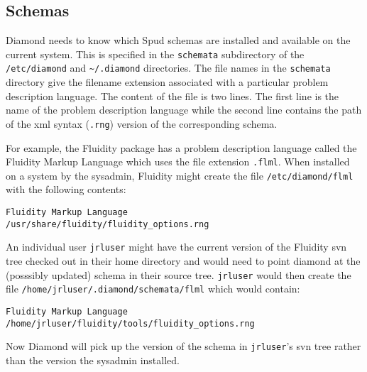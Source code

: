 \documentclass[a4paper, 11pt]{book}
\begin{document}
\subsection{Schemas}

Diamond needs to know which Spud schemas are installed and available on the
current system. This is specified in the \verb+schemata+ subdirectory of the
\verb+/etc/diamond+ and \verb+~/.diamond+ directories. The file names in the
\verb+schemata+ directory give the filename extension associated with a
particular problem description language. The content of the file is two
lines. The first line is the name of the problem description language while
the second line contains the path of the xml syntax (\verb+.rng+) version of
the corresponding schema. 

For example, the Fluidity package has a problem description language called
the Fluidity Markup Language which uses the file extension
\verb+.flml+. When installed on a system by the sysadmin, Fluidity might
create the file \verb+/etc/diamond/flml+ with the following contents:
\begin{verbatim}
Fluidity Markup Language
/usr/share/fluidity/fluidity_options.rng
\end{verbatim}
An individual user \verb+jrluser+ might have the current version of the
Fluidity svn tree checked out in their home directory and would need to
point diamond at the (posssibly updated) schema in their source
tree. \verb+jrluser+ would then create the file
\verb+/home/jrluser/.diamond/schemata/flml+ which would contain:
\begin{verbatim}
Fluidity Markup Language
/home/jrluser/fluidity/tools/fluidity_options.rng
\end{verbatim}
Now Diamond will pick up the version of the schema in \verb+jrluser+'s svn
tree rather than the version the sysadmin installed.
\end{document}

